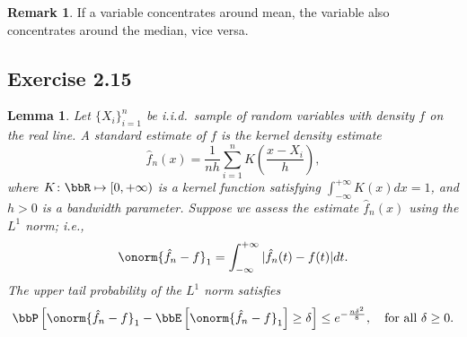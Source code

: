 \documentclass[11pt]{article}
\newcommand{\of}[1]{\left(#1\right)}
\newcommand{\off}[1]{\left[#1\right]}
\theoremstyle{plain}
\newtheorem{lem}{Lemma}
\theoremstyle{definition}
\newtheorem{rmk}{Remark}
\begin{document}
	\begin{rmk}
	If a variable concentrates around mean, the variable also concentrates around the median, vice versa.
	\end{rmk}
	
	
	\subsection{Exercise 2.15}
	\begin{lem}
		Let $\{X_i\}_{i=1}^n$ be i.i.d.\ sample of random variables with density $f$ on the real line. A standard estimate of $f$ is the kernel density estimate 
		\begin{equation}
			\hat f_n (x) = \frac{1}{nh} \sum_{i=1}^n  K\of{ \frac{x- X_i}{h} },
		\end{equation}
		where $K \colon \bbR \mapsto [0,+\infty )$ is a kernel function satisfying $\int_{-\infty}^{+\infty} K(x) dx = 1$, and $h > 0$ is a bandwidth parameter. Suppose we assess the estimate $\hat f_n (x)$ using the $L^1$ norm; i.e.,
		\[ \onorm{\hat f_n - f}_1 = \int_{-\infty}^{+\infty} |\hat f_n(t) - f(t)|dt. \]
		The upper tail probability of the $L^1$ norm satisfies
		\begin{equation}
			\bbP\off{\onorm{\hat f_n - f}_1 - \bbE \off{\onorm{\hat f_n - f}_1}\geq \delta} \leq e^{-\frac{n\delta^2}{8}},\quad \text{for all } \delta \geq 0.
		\end{equation}
	\end{lem}
	
\end{document}
